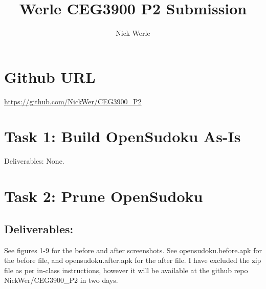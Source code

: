 \documentclass[10pt]{article}
\title{Werle CEG3900 P2 Submission}
\author{Nick Werle}
\begin{document}
\maketitle
\section{Github URL}
\url{https://github.com/NickWer/CEG3900_P2}
\section{Task 1: Build OpenSudoku As-Is}
Deliverables: None.

\section{Task 2: Prune OpenSudoku}
\subsection{Deliverables:}
See figures 1-9 for the before and after screenshots. See opensudoku.before.apk for the before file, and opensudoku.after.apk for the after file. I have excluded the zip file as per in-class instructions, however it will be available at the github repo NickWer/CEG3900\_P2 in two days.
\end{document}
